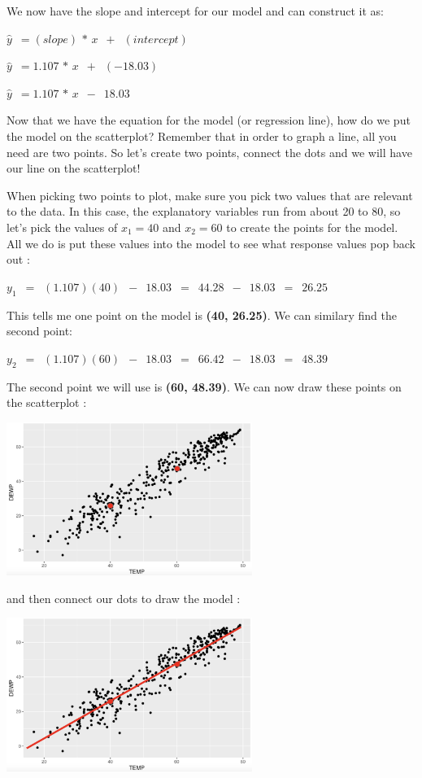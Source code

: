 \documentclass[
  letterpaper,
  DIV=11,
  numbers=noendperiod]{scrreprt}
\begin{document}
We now have the slope and intercept for our model and can construct it
as:

\(\displaystyle{\hat{y} \,\,\, = (slope)\,*\, x \,\,\, + \,\,\, (intercept)}\)

\(\displaystyle{\hat{y} \,\,\, = 1.107\,*\, x \,\,\, + \,\,\, (-18.03)}\)

\(\displaystyle{\hat{y} \,\,\, = 1.107\,*\, x \,\,\, - \,\,\, 18.03}\)

Now that we have the equation for the model (or regression line), how do
we put the model on the scatterplot? Remember that in order to graph a
line, all you need are two points. So let's create two points, connect
the dots and we will have our line on the scatterplot!

When picking two points to plot, make sure you pick two values that are
relevant to the data. In this case, the explanatory variables run from
about 20 to 80, so let's pick the values of \(x_1 = 40\) and
\(x_2 = 60\) to create the points for the model. All we do is put these
values into the model to see what response values pop back out :

\(\displaystyle{y_1 \,\,\, = \,\,\,(1.107)(40)\,\,\, -\,\,\, 18.03\,\,\,
= \,\,\, 44.28 \,\,\,-\,\,\,18.03\,\,\,=\,\,\,26.25}\)

This tells me one point on the model is \textbf{(40, 26.25)}. We can
similary find the second point:

\(\displaystyle{y_2 \,\,\, = \,\,\,(1.107)(60)\,\,\, -\,\,\, 18.03\,\,\,
= \,\,\, 66.42 \,\,\,-\,\,\,18.03\,\,\,=\,\,\,48.39}\)

The second point we will use is \textbf{(60, 48.39)}. We can now draw
these points on the scatterplot :

\includegraphics[width=0.6\textwidth,height=\textheight]{./images/LMR_6.jpg}

and then connect our dots to draw the model :

\includegraphics[width=0.6\textwidth,height=\textheight]{./images/LMR_7.jpg}
\end{document}
